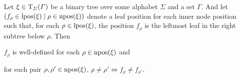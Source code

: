 \documentclass[../document.tex]{subfiles}
\begin{document}
    \begin{lemma}\label{lem:firstviasecond}
        Let \(\xi \in \operatorname{T}_{\varSigma}(\varGamma)\) be a binary tree over some alphabet \(\varSigma\) and a set \(\varGamma\).
        And let \((f_\rho \in \operatorname{lpos}(\xi) \mid \rho \in \operatorname{npos}(\xi))\) denote a leaf position for each inner node position such that, for each \(\rho \in \operatorname{lpos}(\xi)\), the position \(f_\rho\) is the leftmost leaf in the right subtree below \(\rho\).
        Then
        \begin{inparaenum}
            \item \(f_\rho\) is well-defined for each \(\rho \in \operatorname{npos}(\xi)\) and
            \item for each pair \(\rho, \rho' \in \operatorname{npos}(\xi)\), \(\rho \neq \rho' \iff f_\rho \neq f_{\rho'}\).
        \end{inparaenum}
    \end{lemma}

\end{document}
